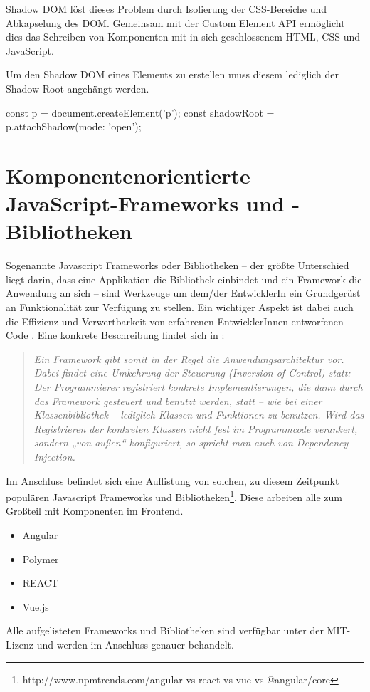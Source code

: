 Shadow DOM löst dieses Problem durch Isolierung der CSS-Bereiche und Abkapselung des DOM. 
Gemeinsam mit der Custom Element API ermöglicht dies das Schreiben von Komponenten mit in sich geschlossenem HTML, CSS und JavaScript.


Um den Shadow DOM eines Elements zu erstellen muss diesem lediglich der Shadow Root angehängt werden.
\begin{JsCode}
	const p = document.createElement('p');
	const shadowRoot = p.attachShadow({mode: 'open'});
\end{JsCode}
\section{Komponentenorientierte JavaScript-Frameworks und -Bibliotheken}
Sogenannte Javascript Frameworks oder Bibliotheken -- der größte Unterschied liegt darin, dass eine Applikation die Bibliothek einbindet und ein Framework die Anwendung an sich -- sind Werkzeuge um dem/der EntwicklerIn ein Grundgerüst an Funktionalität zur Verfügung zu stellen. Ein wichtiger Aspekt ist dabei auch die Effizienz und Verwertbarkeit von erfahrenen EntwicklerInnen entworfenen Code \cite{js-frameworks}.
Eine konkrete Beschreibung findet sich in \cite{wiki-framework}: 
\begin{quote}\textit{Ein Framework gibt somit in der Regel die Anwendungsarchitektur vor. Dabei findet eine Umkehrung der Steuerung (Inversion of Control) statt: Der Programmierer registriert konkrete Implementierungen, die dann durch das Framework gesteuert und benutzt werden, statt – wie bei einer Klassenbibliothek – lediglich Klassen und Funktionen zu benutzen. Wird das Registrieren der konkreten Klassen nicht fest im Programmcode verankert, sondern „von außen“ konfiguriert, so spricht man auch von Dependency Injection.}
\end{quote}

Im Anschluss befindet sich eine Auflistung von solchen, zu diesem Zeitpunkt populären Javascript Frameworks und Bibliotheken\footnote{http://www.npmtrends.com/angular-vs-react-vs-vue-vs-@angular/core}. Diese arbeiten alle zum Großteil mit Komponenten im Frontend.
\begin{itemize}  
	\item Angular
	\item Polymer
	\item REACT
	\item Vue.js
\end{itemize}
Alle aufgelisteten Frameworks und Bibliotheken sind verfügbar unter der MIT-Lizenz und werden im Anschluss genauer behandelt.

